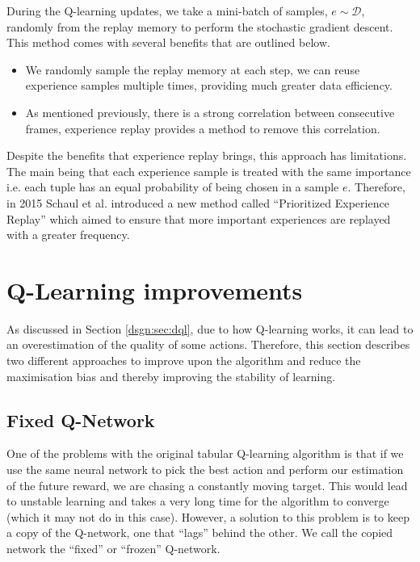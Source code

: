 During the Q-learning updates, we take a mini-batch of samples, $e \sim \mathcal{D}$, randomly from the replay memory to perform the stochastic gradient descent. This method comes with several benefits that are outlined below.

\begin{itemize}
	\item We randomly sample the replay memory at each step, we can reuse experience samples multiple times, providing much greater data efficiency.
	\item As mentioned previously, there is a strong correlation between consecutive frames, experience replay provides a method to remove this correlation.
\end{itemize}

Despite the benefits that experience replay brings, this approach has limitations. The main being that each experience sample is treated with the same importance i.e. each tuple has an equal probability of being chosen in a sample $e$. Therefore, in 2015 Schaul et al. \cite{per} introduced a new method called ``Prioritized Experience Replay'' which aimed to ensure that more important experiences are replayed with a greater frequency.

\section{Q-Learning improvements}
\label{dsgn:sec:qlearning:qextra}
As discussed in Section \ref{dsgn:sec:dql}, due to how Q-learning works, it can lead to an overestimation of the quality of some actions. Therefore, this section describes two different approaches to improve upon the algorithm and reduce the maximisation bias and thereby improving the stability of learning.

\subsection{Fixed Q-Network}
\label{dsgn:sec:qlearning:fixed}
One of the problems with the original tabular Q-learning algorithm is that if we use the same neural network to pick the best action and perform our estimation of the future reward, we are chasing a constantly moving target. This would lead to unstable learning and takes a very long time for the algorithm to converge (which it may not do in this case). However, a solution to this problem is to keep a copy of the Q-network, one that ``lags'' behind the other. We call the copied network the ``fixed'' or ``frozen'' Q-network.

